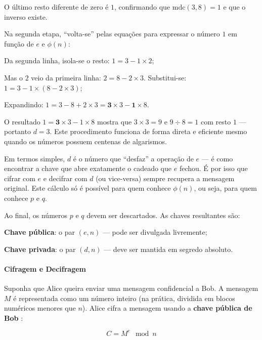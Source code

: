 O último resto diferente de zero é $1$, confirmando que $\text{mdc}(3, 8) = 1$ e que o inverso existe.

Na segunda etapa, ``volta-se'' pelas equações para expressar o número $1$ em função de $e$ e $\phi(n)$:

\begin{alineas}
    \item Da segunda linha, isola-se o resto: $1 = 3 - 1 \times 2$;
    \item Mas o $2$ veio da primeira linha: $2 = 8 - 2 \times 3$. Substitui-se: $1 = 3 - 1 \times (8 - 2 \times 3)$;
    \item Expandindo: $1 = 3 - 8 + 2 \times 3 = \mathbf{3} \times 3 - \mathbf{1} \times 8$.
\end{alineas}

O resultado $1 = \mathbf{3} \times 3 - 1 \times 8$ mostra que $3 \times 3 = 9$ e $9 \div 8 = 1$ com resto $1$ --- portanto $d = 3$. Este procedimento funciona de forma direta e eficiente mesmo quando os números possuem centenas de algarismos.

Em termos simples, $d$ é o número que ``desfaz'' a operação de $e$ --- é como encontrar a chave que abre exatamente o cadeado que $e$ fechou. É por isso que cifrar com $e$ e decifrar com $d$ (ou vice-versa) sempre recupera a mensagem original. Este cálculo só é possível para quem conhece $\phi(n)$, ou seja, para quem conhece $p$ e $q$.

Ao final, os números $p$ e $q$ devem ser descartados. As chaves resultantes são:

\begin{alineas}
    \item \textbf{Chave pública}: o par $(e, n)$ --- pode ser divulgada livremente;
    \item \textbf{Chave privada}: o par $(d, n)$ --- deve ser mantida em segredo absoluto.
\end{alineas}

\paragraph{Cifragem e Decifragem}

Suponha que Alice queira enviar uma mensagem confidencial a Bob. A mensagem $M$ é representada como um número inteiro (na prática, dividida em blocos numéricos menores que $n$). Alice cifra a mensagem usando a \textbf{chave pública de Bob} \cite{tomaz2014}:

\begin{equation}
\label{eq:rsa-cifra}
C = M^e \mod n
\end{equation}

